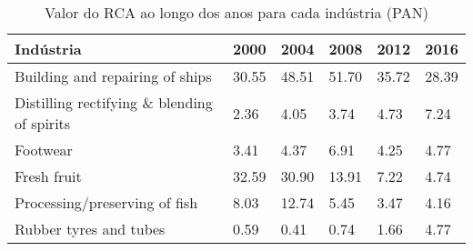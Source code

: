 \begin{table}
\centering
\caption{Valor do RCA ao longo dos anos para cada indústria (PAN)}
\label{tab:ex3-tempo-PAN}
\begin{tabular}{p{6cm}p{1.5cm}p{1.5cm}p{1.5cm}p{1.5cm}p{1.5cm}}
\toprule
                                  Indústria &  2000 &  2004 &  2008 &  2012 &  2016 \\
\midrule
            Building and repairing of ships & 30.55 & 48.51 & 51.70 & 35.72 & 28.39 \\
Distilling rectifying \& blending of spirits &  2.36 &  4.05 &  3.74 &  4.73 &  7.24 \\
                                   Footwear &  3.41 &  4.37 &  6.91 &  4.25 &  4.77 \\
                                Fresh fruit & 32.59 & 30.90 & 13.91 &  7.22 &  4.74 \\
              Processing/preserving of fish &  8.03 & 12.74 &  5.45 &  3.47 &  4.16 \\
                     Rubber tyres and tubes &  0.59 &  0.41 &  0.74 &  1.66 &  4.77 \\
\bottomrule
\end{tabular}
\end{table}
